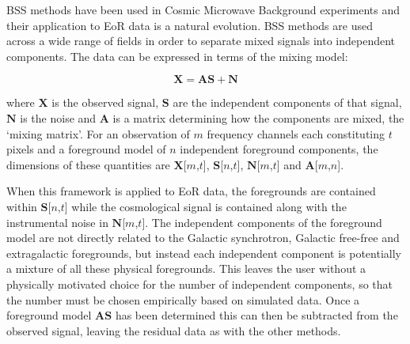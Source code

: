  BSS methods have been used in Cosmic Microwave Background experiments \cite{PlanckI2018arXiv180706205P,PlanckIV2018} and their application to EoR data is a natural evolution. BSS methods are used across a wide range of fields in order to separate mixed signals into independent components. The data can be expressed in terms of the mixing model:

\begin{equation}
\mathbf{X} = \mathbf{A}\mathbf{S} + \mathbf{N}
\end{equation}

\noindent where $\mathbf{X}$ is the observed signal, $\mathbf{S}$ are the independent components of that signal, $\mathbf{N}$ is the noise and $\mathbf{A}$ is a matrix determining how the components are mixed, the `mixing matrix'. For an observation of $m$ frequency channels each constituting $t$ pixels and a foreground model of $n$ independent foreground components, the dimensions of these quantities are $\mathbf{X}$[$m$,$t$], $\mathbf{S}$[$n$,$t$], $\mathbf{N}$[$m$,$t$] and $\mathbf{A}$[$m$,$n$].

When this framework is applied to EoR data, the foregrounds are contained within $\mathbf{S}$[$n$,$t$] while the cosmological signal is contained along with the instrumental noise in $\mathbf{N}$[$m$,$t$]. The independent components of the foreground model are not directly related to the Galactic synchrotron, Galactic free-free and extragalactic foregrounds, but instead each independent component is potentially a mixture of all these physical foregrounds. This leaves the user without a physically motivated choice for the number of independent components, so that the number must be chosen empirically based on simulated data. Once a foreground model $\mathbf{A}\mathbf{S}$ has been determined this can then be subtracted from the observed signal, leaving the residual data as with the other methods.

